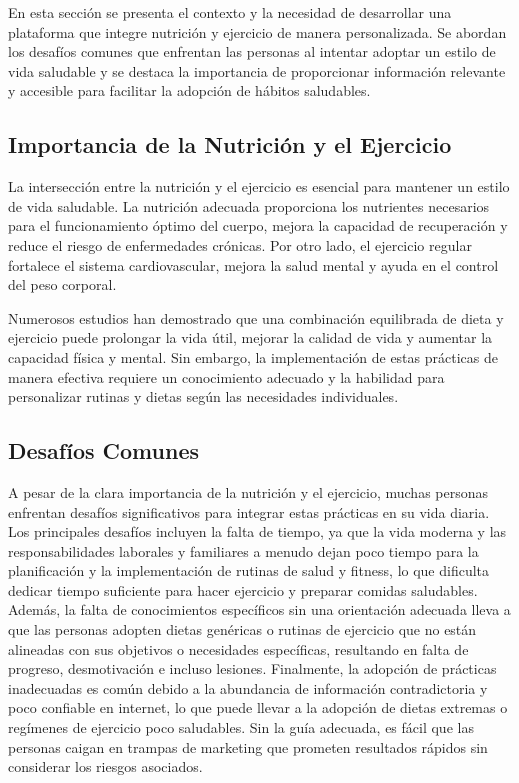 \begin{description}
  En esta sección se presenta el contexto y la necesidad de desarrollar una plataforma que integre nutrición y ejercicio de manera personalizada. Se abordan los desafíos comunes que enfrentan las personas al intentar adoptar un estilo de vida saludable y se destaca la importancia de proporcionar información relevante y accesible para facilitar la adopción de hábitos saludables.
  \subsection{Importancia de la Nutrición y el Ejercicio}
  \item La intersección entre la nutrición y el ejercicio es esencial para mantener un estilo de vida saludable. La nutrición adecuada proporciona los nutrientes necesarios para el funcionamiento óptimo del cuerpo, mejora la capacidad de recuperación y reduce el riesgo de enfermedades crónicas. Por otro lado, el ejercicio regular fortalece el sistema cardiovascular, mejora la salud mental y ayuda en el control del peso corporal.
  \item Numerosos estudios han demostrado que una combinación equilibrada de dieta y ejercicio puede prolongar la vida útil, mejorar la calidad de vida y aumentar la capacidad física y mental. Sin embargo, la implementación de estas prácticas de manera efectiva requiere un conocimiento adecuado y la habilidad para personalizar rutinas y dietas según las necesidades individuales.
  \subsection{Desafíos Comunes}
  A pesar de la clara importancia de la nutrición y el ejercicio, muchas personas enfrentan desafíos significativos para integrar estas prácticas en su vida diaria. Los principales desafíos incluyen la falta de tiempo, ya que la vida moderna y las responsabilidades laborales y familiares a menudo dejan poco tiempo para la planificación y la implementación de rutinas de salud y fitness, lo que dificulta dedicar tiempo suficiente para hacer ejercicio y preparar comidas saludables. Además, la falta de conocimientos específicos sin una orientación adecuada lleva a que las personas adopten dietas genéricas o rutinas de ejercicio que no están alineadas con sus objetivos o necesidades específicas, resultando en falta de progreso, desmotivación e incluso lesiones. Finalmente, la adopción de prácticas inadecuadas es común debido a la abundancia de información contradictoria y poco confiable en internet, lo que puede llevar a la adopción de dietas extremas o regímenes de ejercicio poco saludables. Sin la guía adecuada, es fácil que las personas caigan en trampas de marketing que prometen resultados rápidos sin considerar los riesgos asociados.

\end{description}
